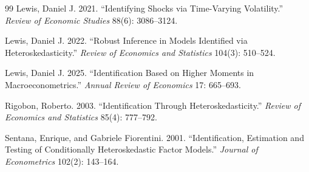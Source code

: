 \documentclass[11pt]{article}
\theoremstyle{plain}
\theoremstyle{definition}
\theoremstyle{remark}
\begin{document}
\begin{thebibliography}{99}
Lewis, Daniel J. 2021. ``Identifying Shocks via Time-Varying Volatility.''
\emph{Review of Economic Studies} 88(6): 3086--3124.

Lewis, Daniel J. 2022. ``Robust Inference in Models Identified via
Heteroskedasticity.'' \emph{Review of Economics and Statistics} 104(3): 510--524.

Lewis, Daniel J. 2025. ``Identification Based on Higher Moments in
Macroeconometrics.'' \emph{Annual Review of Economics} 17: 665--693.

Rigobon, Roberto. 2003. ``Identification Through Heteroskedasticity.''
\emph{Review of Economics and Statistics} 85(4): 777--792.

Sentana, Enrique, and Gabriele Fiorentini. 2001. ``Identification, Estimation and
Testing of Conditionally Heteroskedastic Factor Models.'' \emph{Journal of
Econometrics} 102(2): 143--164.

\end{thebibliography}
\end{document}
